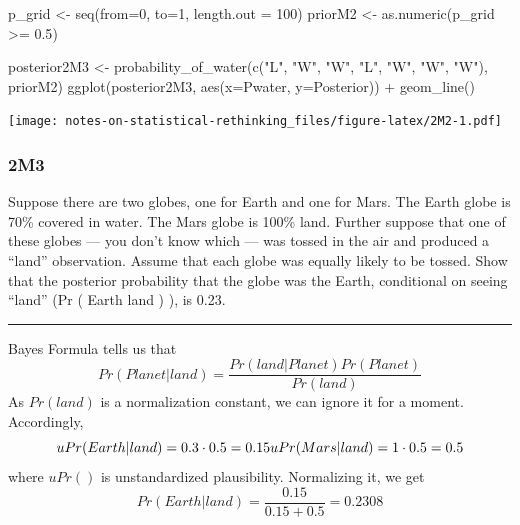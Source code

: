 \documentclass[
]{book}
\newenvironment{Shaded}{\begin{snugshade}}{\end{snugshade}}
\newcommand{\AttributeTok}[1]{\textcolor[rgb]{0.77,0.63,0.00}{#1}}
\newcommand{\DecValTok}[1]{\textcolor[rgb]{0.00,0.00,0.81}{#1}}
\newcommand{\FloatTok}[1]{\textcolor[rgb]{0.00,0.00,0.81}{#1}}
\newcommand{\FunctionTok}[1]{\textcolor[rgb]{0.00,0.00,0.00}{#1}}
\newcommand{\NormalTok}[1]{#1}
\newcommand{\OtherTok}[1]{\textcolor[rgb]{0.56,0.35,0.01}{#1}}
\newcommand{\SpecialCharTok}[1]{\textcolor[rgb]{0.00,0.00,0.00}{#1}}
\newcommand{\StringTok}[1]{\textcolor[rgb]{0.31,0.60,0.02}{#1}}
\begin{document}
\begin{Shaded}
\begin{Highlighting}[]
\NormalTok{p\_grid }\OtherTok{\textless{}{-}} \FunctionTok{seq}\NormalTok{(}\AttributeTok{from=}\DecValTok{0}\NormalTok{, }\AttributeTok{to=}\DecValTok{1}\NormalTok{, }\AttributeTok{length.out =} \DecValTok{100}\NormalTok{)}
\NormalTok{priorM2 }\OtherTok{\textless{}{-}} \FunctionTok{as.numeric}\NormalTok{(p\_grid }\SpecialCharTok{\textgreater{}=} \FloatTok{0.5}\NormalTok{)}

\NormalTok{posterior2M3 }\OtherTok{\textless{}{-}} \FunctionTok{probability\_of\_water}\NormalTok{(}\FunctionTok{c}\NormalTok{(}\StringTok{"L"}\NormalTok{, }\StringTok{"W"}\NormalTok{, }\StringTok{"W"}\NormalTok{, }\StringTok{"L"}\NormalTok{, }\StringTok{"W"}\NormalTok{, }\StringTok{"W"}\NormalTok{, }\StringTok{"W"}\NormalTok{), priorM2)}
\FunctionTok{ggplot}\NormalTok{(posterior2M3, }\FunctionTok{aes}\NormalTok{(}\AttributeTok{x=}\NormalTok{Pwater, }\AttributeTok{y=}\NormalTok{Posterior)) }\SpecialCharTok{+} 
  \FunctionTok{geom\_line}\NormalTok{() }
\end{Highlighting}
\end{Shaded}

\texttt{[image: notes-on-statistical-rethinking\_files/figure-latex/2M2-1.pdf]}

\hypertarget{m3}{%
\subsubsection*{2M3}\label{m3}}

Suppose there are two globes, one for Earth and one for Mars. The Earth globe is 70\% covered in water. The Mars globe is 100\% land. Further suppose that one of these globes --- you don't know which --- was tossed in the air and produced a ``land'' observation. Assume that each globe was equally likely to be tossed. Show that the posterior probability that the globe was the Earth, conditional on seeing ``land'' (Pr ( Earth \textbar{} land ) ), is 0.23.

\begin{center}\rule{0.5\linewidth}{0.5pt}\end{center}

Bayes Formula tells us that
\[Pr(Planet | land) = \frac{Pr(land | Planet) Pr(Planet)}{Pr(land)}\]
As \(Pr(land)\) is a normalization constant, we can ignore it for a moment. Accordingly,
\[uPr(Earth | land) = 0.3 \cdot 0.5 = 0.15\\
uPr(Mars | land) = 1 \cdot 0.5 = 0.5\]
where \(uPr()\) is unstandardized plausibility. Normalizing it, we get
\[Pr(Earth | land) = \frac{0.15}{0.15 + 0.5} = 0.2308\]
\end{document}
